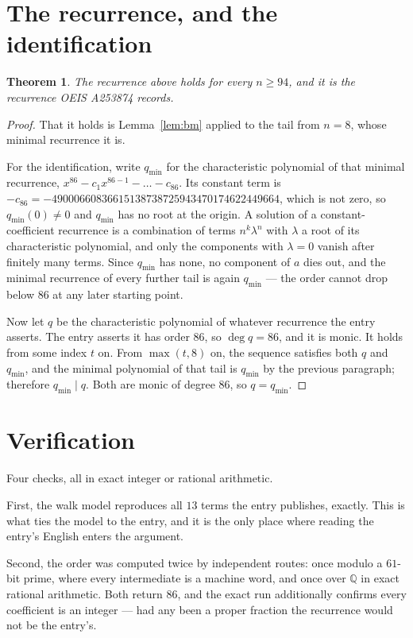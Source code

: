 \documentclass[11pt,a4paper]{article}
\theoremstyle{plain}
\newtheorem{theorem}{Theorem}
\theoremstyle{definition}
\begin{document}
\section{The recurrence, and the identification}

\begin{theorem}
The recurrence above holds for every $n\ge94$, and it is the recurrence OEIS A253874 records.
\end{theorem}

\begin{proof}
That it holds is Lemma~\ref{lem:bm} applied to the tail from $n=8$, whose minimal
recurrence it is.

For the identification, write $q_{\min}$ for the characteristic polynomial of that minimal
recurrence, $x^{86}-c_1x^{86-1}-\dots-c_{86}$. Its constant term is
$-c_{86}=-49000660836615138738725943470174622449664$, which is not zero, so $q_{\min}(0)\neq0$ and $q_{\min}$ has no
root at the origin. A solution of a constant-coefficient recurrence is a combination of terms
$n^{k}\lambda^{n}$ with $\lambda$ a root of its characteristic polynomial, and only the
components with $\lambda=0$ vanish after finitely many terms. Since $q_{\min}$ has none, no
component of $a$ dies out, and the minimal recurrence of every further tail is again
$q_{\min}$ --- the order cannot drop below $86$ at any later starting point.

Now let $q$ be the characteristic polynomial of whatever recurrence the entry asserts. The
entry asserts it has order $86$, so $\deg q=86$, and it is monic. It holds from some
index $t$ on. From $\max(t,8)$ on, the sequence satisfies both $q$ and $q_{\min}$, and
the minimal polynomial of that tail is $q_{\min}$ by the previous paragraph; therefore
$q_{\min}\mid q$. Both are monic of degree $86$, so $q=q_{\min}$.
\end{proof}

\section{Verification}

Four checks, all in exact integer or rational arithmetic.

First, the walk model reproduces all $13$ terms the entry publishes, exactly. This is
what ties the model to the entry, and it is the only place where reading the entry's English
enters the argument.

Second, the order was computed twice by independent routes: once modulo a $61$-bit prime, where
every intermediate is a machine word, and once over $\mathbb{Q}$ in exact rational arithmetic.
Both return $86$, and the exact run additionally confirms every coefficient is an integer
--- had any been a proper fraction the recurrence would not be the entry's.
\end{document}
